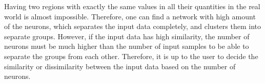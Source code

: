 Having two regions with exactly the same values in all their quantities in the real world is almost impossible. 
Therefore, one can find a network with high amount of the neurons, which separates the input data completely, and clusters them into separate groups.
However, if the input data has high similarity, the number of neurons must be much higher than the number of input samples to be able to separate the groups from each other. 
Therefore, it is up to the user to decide the similarity or dissimilarity between the input data based on the number of neurons. 